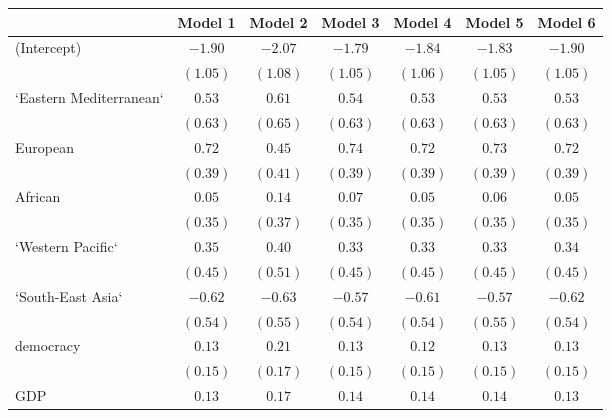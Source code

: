 
\begin{table}[!h]
\begin{center}
\begin{tabular}{l c c c c c c }
\toprule
 & Model 1 & Model 2 & Model 3 & Model 4 & Model 5 & Model 6 \\
\midrule
(Intercept)             & $-1.90$      & $-2.07$      & $-1.79$      & $-1.84$      & $-1.83$      & $-1.90$      \\
                        & $(1.05)$     & $(1.08)$     & $(1.05)$     & $(1.06)$     & $(1.05)$     & $(1.05)$     \\
`Eastern Mediterranean` & $0.53$       & $0.61$       & $0.54$       & $0.53$       & $0.53$       & $0.53$       \\
                        & $(0.63)$     & $(0.65)$     & $(0.63)$     & $(0.63)$     & $(0.63)$     & $(0.63)$     \\
European                & $0.72$       & $0.45$       & $0.74$       & $0.72$       & $0.73$       & $0.72$       \\
                        & $(0.39)$     & $(0.41)$     & $(0.39)$     & $(0.39)$     & $(0.39)$     & $(0.39)$     \\
African                 & $0.05$       & $0.14$       & $0.07$       & $0.05$       & $0.06$       & $0.05$       \\
                        & $(0.35)$     & $(0.37)$     & $(0.35)$     & $(0.35)$     & $(0.35)$     & $(0.35)$     \\
`Western Pacific`       & $0.35$       & $0.40$       & $0.33$       & $0.33$       & $0.33$       & $0.34$       \\
                        & $(0.45)$     & $(0.51)$     & $(0.45)$     & $(0.45)$     & $(0.45)$     & $(0.45)$     \\
`South-East Asia`       & $-0.62$      & $-0.63$      & $-0.57$      & $-0.61$      & $-0.57$      & $-0.62$      \\
                        & $(0.54)$     & $(0.55)$     & $(0.54)$     & $(0.54)$     & $(0.55)$     & $(0.54)$     \\
democracy               & $0.13$       & $0.21$       & $0.13$       & $0.12$       & $0.13$       & $0.13$       \\
                        & $(0.15)$     & $(0.17)$     & $(0.15)$     & $(0.15)$     & $(0.15)$     & $(0.15)$     \\
GDP                     & $0.13$       & $0.17$       & $0.14$       & $0.14$       & $0.14$       & $0.13$       \\

\end{tabular}
\end{center}
\end{table}
